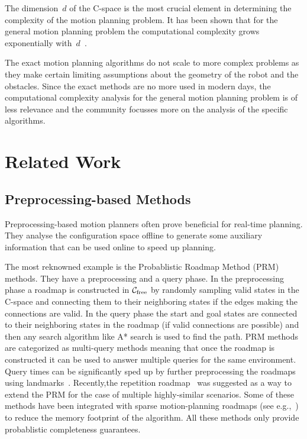 \documentclass[a4paper,10pt]{article}
\begin{document}
The dimension~$d$ of the C-space is the most crucial element in determining the complexity of the motion planning problem. It has been shown that for the general motion planning problem the computational complexity grows exponentially with~$d$~\cite{chazelle1991singly}.

The exact motion planning algorithms do not scale to more complex problems as they make certain limiting assumptions about the geometry of the robot and the obstacles. Since the exact methods are no more used in modern days, the computational complexity analysis for the general motion planning problem is of less relevance and the community focusses more on the analysis of the specific algorithms.


\newpage
\section{Related Work}
\label{sec:rel}
\subsection{Preprocessing-based Methods}
Preprocessing-based motion planners often prove beneficial for real-time planning. They analyse the configuration space offline to generate some auxiliary information that can be used online to speed up planning. 

The most reknowned example is the Probablistic Roadmap Method (PRM)~\cite{kavraki1996probabilistic} methods. They have a preprocessing and a query phase. In the preprocessing phase a roadmap is constructed in $\mathcal{C}_{\rm free}$ by randomly sampling valid states in the C-space and connecting them to their neighboring states if the edges making the connections are valid. In the query phase the start and goal states are connected to their neighboring states in the roadmap (if valid connections are possible) and then any search algorithm like A* search is used to find the path. PRM methods are categorized as multi-query methods meaning that once the roadmap is constructed it can be used to answer multiple queries for the same environment. Query times can be significantly sped up by further preprocessing the roadmaps using landmarks~\cite{paden2017landmark}. Recently,the repetition roadmap~\cite{LA18} was suggested as a way to extend the \textsf{PRM} for the case of multiple highly-similar scenarios. Some of these methods have been integrated with sparse motion-planning roadmaps (see e.g.,~\cite{SSAH14,DB14}) to reduce the memory footprint of the algorithm. All these methods only provide probablistic completeness guarantees.
\end{document}
